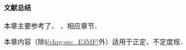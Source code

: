 
\paragraph{文献总结}本章主要参考了\parencite{oneill1983}、
\parencite{cc2001-zh}、\parencite{chen-li-2023-2ed-v1}相应章节．

本章内容（除\S\ref{chrg:sec_E3MF}外）适用于正定、不定度规．



\endinput
